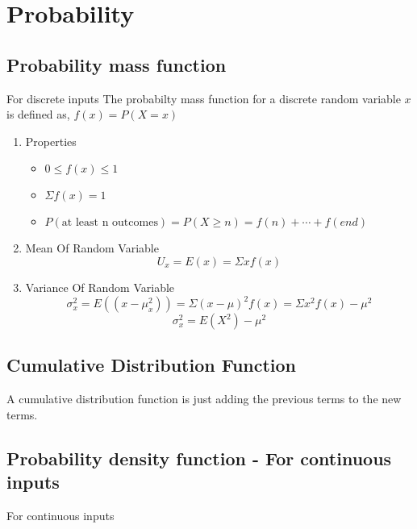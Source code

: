 \documentclass[11pt]{report}
\begin{document}
\chapter{Probability}
\label{sec:org0ddc0fe}
\section{Probability mass function}
\label{sec:org8fd60f2}
For discrete inputs
The probabilty mass function for a discrete random variable \(x\) is defined as, \(f(x) = P(X = x)\)
\begin{enumerate}
\item Properties
\label{sec:org13c7baa}
\begin{itemize}
\item \(0 \leq f(x) \leq 1\)
\item \(\Sigma f(x) = 1\)
\item \(P(\text{at least n outcomes}) = P(X \geq n) = f(n) + \cdots + f(end)\)
\end{itemize}
\item Mean Of Random Variable
\label{sec:org62914e7}
$$U_x = E(x) = \Sigma x f(x)$$
\item Variance Of Random Variable
\label{sec:org7fe8413}
$$\sigma_x^{2} = E((x-\mu_{x}^2)) = \Sigma (x-\mu)^2 f(x) = \Sigma x^2f(x) - \mu^{2}$$
$$\sigma_x^{2} = E(X^2) - \mu^2$$
\end{enumerate}
\section{Cumulative Distribution Function}
\label{sec:orgc3a44d7}
A cumulative distribution function is just adding the previous terms to the new terms.
\section{Probability density function - For continuous inputs}
\label{sec:org257e467}
For continuous inputs
\end{document}
